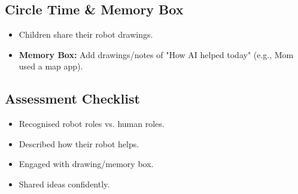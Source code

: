 \documentclass[11pt, a4paper]{article}
\begin{document}
\subsection{Circle Time \& Memory Box}
\begin{itemize}
    \item Children share their robot drawings.
    \item \textbf{Memory Box:} Add drawings/notes of "How AI helped today" (e.g., Mom used a map app).
\end{itemize}

\subsection*{Assessment Checklist}
\begin{itemize}
    \item Recognised robot roles vs. human roles.
    \item Described how their robot helps.
    \item Engaged with drawing/memory box.
    \item Shared ideas confidently.
\end{itemize}
\end{document}
